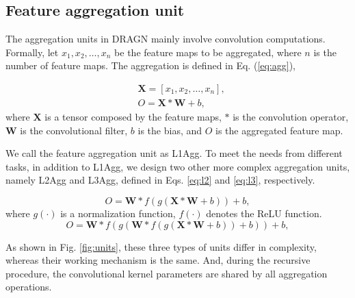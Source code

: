 \documentclass[10pt,twocolumn,letterpaper]{article}
\begin{document}
\subsection{Feature aggregation unit} \label{sec:fa}
The aggregation units in DRAGN mainly involve convolution computations. Formally, let $x_{1}, x_{2}, \ldots, x_{n}$ be the feature maps to be aggregated, where $n$ is the number of feature maps. The aggregation is defined in Eq. (\ref{eq:agg}),

\begin{equation}
\begin{split}
&\textbf{X}=[x_{1}, x_{2}, \ldots, x_{n}],\\
&O= \textbf{X}*\textbf{W}+b,
\end{split}
\label{eq:agg}
\end{equation}
where $\textbf{X}$ is a tensor composed by the feature maps, $*$ is the convolution operator, $\textbf{W}$ is the convolutional filter, $b$ is the bias, and $O$ is the aggregated feature map. %

We call the feature aggregation unit as L1Agg. To meet the needs from different tasks, in addition to L1Agg, we design two other more complex aggregation units, namely L2Agg and L3Agg, defined in Eqs. \ref{eq:l2} and \ref{eq:l3}, respectively. 

\begin{equation}
O= \textbf{W}*f(g(\textbf{X}*\textbf{W}+b))+b,
\label{eq:l2}
\end{equation}
where $g(\cdot)$ is a normalization function, $f(\cdot)$ denotes the ReLU function.
%
\begin{equation}
O= \textbf{W}*f(g(\textbf{W}*f(g(\textbf{X}*\textbf{W}+b))+b))+b,
\label{eq:l3}
\end{equation}


As shown in Fig. \ref{fig:units}, these three types of units differ in complexity, whereas their working mechanism is the same. And, during the recursive procedure, the convolutional kernel parameters are shared by all aggregation operations.
\end{document}
